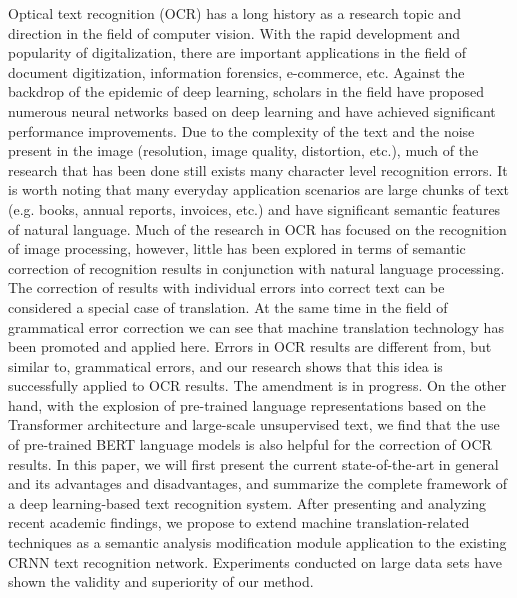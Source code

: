 \begin{englishabstract}
	Optical text recognition (OCR) has a long history as a research topic and direction in the field of computer vision.
	With the rapid development and popularity of digitalization, there are important applications in the field of document digitization, information forensics, e-commerce, etc.
	Against the backdrop of the epidemic of deep learning, scholars in the field have proposed numerous neural networks based on deep learning and have achieved significant performance improvements.
	Due to the complexity of the text and the noise present in the image (resolution, image quality, distortion, etc.), much of the research that has been done still exists many character level recognition errors.
	It is worth noting that many everyday application scenarios are large chunks of text (e.g. books, annual reports, invoices, etc.) and have significant semantic features of natural language.
	Much of the research in OCR has focused on the recognition of image processing, however, little has been explored in terms of semantic correction of recognition results in conjunction with natural language processing.
	The correction of results with individual errors into correct text can be considered a special case of translation.
	At the same time in the field of grammatical error correction we can see that machine translation technology has been promoted and applied here.
	Errors in OCR results are different from, but similar to, grammatical errors, and our research shows that this idea is successfully applied to OCR results.
	The amendment is in progress.
	On the other hand, with the explosion of pre-trained language representations based on the Transformer architecture and large-scale unsupervised text, we find that the use of pre-trained BERT language models is also helpful for the correction of OCR results.
	In this paper, we will first present the current state-of-the-art in general and its advantages and disadvantages, and summarize the complete framework of a deep learning-based text recognition system.
	After presenting and analyzing recent academic findings, we propose to extend machine translation-related techniques as a semantic analysis modification module application to the existing CRNN text recognition network.
	Experiments conducted on large data sets have shown the validity and superiority of our method.
	
\end{englishabstract}
